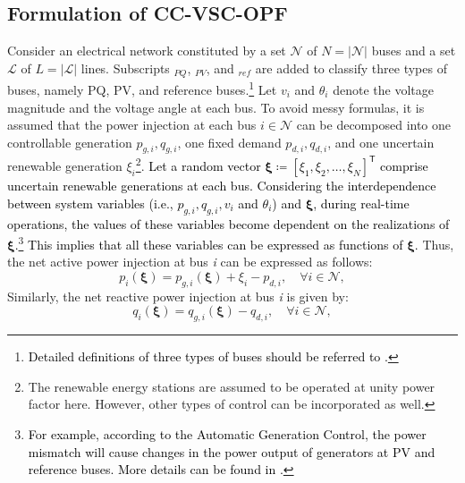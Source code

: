 \documentclass[journal]{IEEEtran}
\theoremstyle{definition}
\theoremstyle{remark}
\begin{document}
\subsection{Formulation of CC-VSC-OPF}
Consider an electrical network constituted by a set \(\mathcal{N}\) of \(N=\left|\mathcal{N}\right|\) buses and a set \(\mathcal{L}\) of \(L=\left|\mathcal{L}\right|\) lines. Subscripts $_{PQ}$, $_{PV}$, and $_{ref}$ are added to classify three types of buses, namely PQ, PV, and reference buses.\textcolor{black}{\footnote{\textcolor{black}{Detailed definitions of three types of buses should be referred to \cite{glover2012power}.}}} Let $v_i$ and $\theta_i$ denote the voltage magnitude and the voltage angle at each bus. To avoid messy formulas, it is assumed that the power injection at each bus $i\in\mathcal{N}$ can be decomposed into one controllable generation $p_{g,i},q_{g,i}$, one fixed demand $p_{d,i},q_{d,i}$, and one uncertain renewable generation $\xi_{i}$\footnote{The renewable energy stations are assumed to be operated at unity power factor here. However, other types of control can be incorporated as well.}. \textcolor{black}{Let a random vector $\boldsymbol{\xi}\coloneqq[\xi_1,\xi_2,\dots,\xi_N]^{\mathsf{T}}$ comprise uncertain renewable generations at each bus. Considering the interdependence between system variables (i.e., $p_{g,i},q_{g,i},v_i$ and $\theta_i$) and $\boldsymbol{\xi}$, during real-time operations, the values of these variables become dependent on the realizations of $\boldsymbol{\xi}$.\textcolor{black}{\footnote{\textcolor{black}{For example, according to the Automatic Generation Control, the power mismatch will cause changes in the power output of generators at PV and reference buses. More details can be found in \cite{roald2018chance}.}}} This implies that all these variables can be expressed as functions of $\boldsymbol{\xi}$.} Thus, the net active power injection at bus \textit{i} can be expressed as follows:
\begin{equation}\label{eq:1}
    p_i(\boldsymbol{\xi})=p_{g,i}(\boldsymbol{\xi})+\xi_{i}-p_{d,i},\quad \forall i \in \mathcal{N},
\end{equation}
Similarly, the net reactive power injection at bus \textit{i} is given by:
\begin{equation}\label{eq:2}
    q_i(\boldsymbol{\xi})=q_{g,i}(\boldsymbol{\xi})-q_{d,i},\quad \forall i \in \mathcal{N},
\end{equation}
\end{document}
